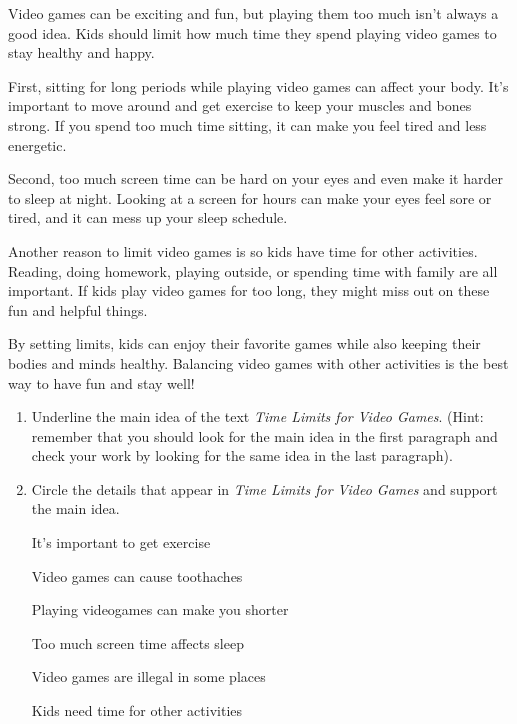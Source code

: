 \documentclass[12pt]{article}
\begin{document}
\begin{tcolorbox}[colframe=black!60, colback=white, 
coltitle=black, colbacktitle=black!15, fonttitle=\bfseries\Large, 
title=Text: Time Limits for Video Games, halign title=center, left=10pt, right=10pt, top=10pt, bottom=15pt]
Video games can be exciting and fun, but playing them too much isn’t always a good idea. Kids should limit how much time they spend playing video games to stay healthy and happy.

First, sitting for long periods while playing video games can affect your body. It’s important to move around and get exercise to keep your muscles and bones strong. If you spend too much time sitting, it can make you feel tired and less energetic.

Second, too much screen time can be hard on your eyes and even make it harder to sleep at night. Looking at a screen for hours can make your eyes feel sore or tired, and it can mess up your sleep schedule.

Another reason to limit video games is so kids have time for other activities. Reading, doing homework, playing outside, or spending time with family are all important. If kids play video games for too long, they might miss out on these fun and helpful things.

By setting limits, kids can enjoy their favorite games while also keeping their bodies and minds healthy. Balancing video games with other activities is the best way to have fun and stay well! 




     \end{tcolorbox}

\begin{tcolorbox}[colframe=black!60, colback=white, 
coltitle=black, colbacktitle=black!15, fonttitle=\bfseries\Large, 
title=Independent Practice, halign title=center, left=10pt, right=10pt, top=10pt, bottom=15pt]

\begin{enumerate}[itemsep=3em] %
    \item Underline the main idea of the text \textit{Time Limits for Video Games}. (Hint: remember that you should look for the main idea in the first paragraph and check your work by looking for the same idea in the last paragraph).

   
    \item Circle the details that appear in \textit{Time Limits for Video Games} and support the main idea.

\vspace{0.5em}
It's important to get exercise

Video games can cause toothaches

Playing videogames can make you shorter

Too much screen time affects sleep

Video games are illegal in some places

Kids need time for other activities
\end{enumerate}
\vspace{1em}
\end{tcolorbox}
\end{document}
